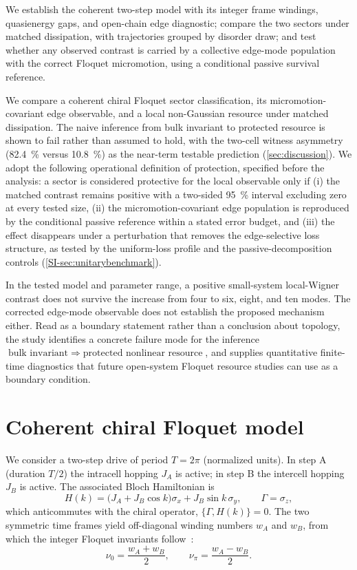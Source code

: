 \documentclass[aps,pra,preprint,superscriptaddress,amsmath,amssymb]{revtex4-2}
\begin{document}
We establish the coherent two-step model with its integer frame windings, quasienergy gaps, and open-chain edge diagnostic; compare the two sectors under matched dissipation, with trajectories grouped by disorder draw; and test whether any observed contrast is carried by a collective edge-mode population with the correct Floquet micromotion, using a conditional passive survival reference.

We compare a coherent chiral Floquet sector classification, its micromotion-covariant edge observable, and a local non-Gaussian resource under matched dissipation. The naive inference from bulk invariant to protected resource is shown to fail rather than assumed to hold, with the two-cell witness asymmetry (\qty{82.4}{\percent} versus \qty{10.8}{\percent}) as the near-term testable prediction (\cref{sec:discussion}). We adopt the following operational definition of protection, specified before the analysis: a sector is considered protective for the local observable only if (i) the matched contrast remains positive with a two-sided \qty{95}{\percent} interval excluding zero at every tested size, (ii) the micromotion-covariant edge population is reproduced by the conditional passive reference within a stated error budget, and (iii) the effect disappears under a perturbation that removes the edge-selective loss structure, as tested by the uniform-loss profile and the passive-decomposition controls (\cref{SI-sec:unitarybenchmark}).

In the tested model and parameter range, a positive small-system local-Wigner contrast does not survive the increase from four to six, eight, and ten modes. The corrected edge-mode observable does not establish the proposed mechanism either. Read as a boundary statement rather than a conclusion about topology, the study identifies a concrete failure mode for the inference $\text{bulk invariant}\;\Longrightarrow\;\text{protected nonlinear resource}$, and supplies quantitative finite-time diagnostics that future open-system Floquet resource studies can use as a boundary condition.

\section{Coherent chiral Floquet model}
\label{sec:model}

We consider a two-step drive of period $T=2\pi$ (normalized units). In step A (duration $T/2$) the intracell hopping $J_A$ is active; in step B the intercell hopping $J_B$ is active. The associated Bloch Hamiltonian is
\begin{equation}\label{eq:bulk}
  H(k)=\bigl(J_A+J_B\cos k\bigr)\sigma_x+J_B\sin k\,\sigma_y,
  \qquad\Gamma=\sigma_z,
\end{equation}
which anticommutes with the chiral operator, $\{\Gamma,H(k)\}=0$. The two symmetric time frames yield off-diagonal winding numbers $w_A$ and $w_B$, from which the integer Floquet invariants follow~\cite{Asboth2014}:
\begin{equation}\label{eq:invariants}
  \nu_0=\frac{w_A+w_B}{2},\qquad
  \nu_\pi=\frac{w_A-w_B}{2}.
\end{equation}
\end{document}
